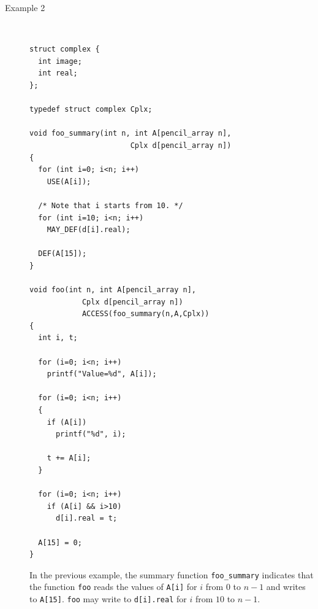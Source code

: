 \documentclass{carp}
\begin{document}
\begin{description}
  
  \item[Example 2]~
  \begin{lstlisting}[language=pencil]
struct complex {
  int image;
  int real;
};

typedef struct complex Cplx;

void foo_summary(int n, int A[pencil_array n],
                       Cplx d[pencil_array n])
{
  for (int i=0; i<n; i++)
    USE(A[i]);

  /* Note that i starts from 10. */
  for (int i=10; i<n; i++)
    MAY_DEF(d[i].real);

  DEF(A[15]);
}

void foo(int n, int A[pencil_array n],
            Cplx d[pencil_array n])
            ACCESS(foo_summary(n,A,Cplx))
{
  int i, t;

  for (i=0; i<n; i++)
    printf("Value=%d", A[i]);

  for (i=0; i<n; i++)
  {
    if (A[i])
      printf("%d", i);

    t += A[i];
  }

  for (i=0; i<n; i++)
    if (A[i] && i>10)
      d[i].real = t;

  A[15] = 0;
}
  \end{lstlisting}

  In the previous example, the summary function
  \lstinline!foo_summary!  indicates that the function
  \lstinline!foo! reads the values of \lstinline!A[i]!  for $i$
  from $0$ to $n-1$ and writes to \lstinline!A[15]!.
  \lstinline!foo! may write to \lstinline!d[i].real! for $i$
  from $10$ to $n-1$. 
\end{description}
\end{document}
